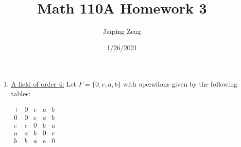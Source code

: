 \documentclass{article}
\title{Math 110A Homework 3}
\date{1/26/2021}
\author{Jiaping Zeng}
\begin{document}
\maketitle

\begin{enumerate}
      \item \underline{A field of order 4:} Let $F=\{0,e,a,b\}$ with operations given by the following tables:
            \begin{center}
                  \begin{multicols}{2}
                        $\begin{array}{c|cccc}
                                    + & 0 & e & a & b \\
                                    \hline
                                    0 & 0 & e & a & b \\
                                    e & e & 0 & b & a \\
                                    a & a & b & 0 & e \\
                                    b & b & a & e & 0
                              \end{array}$


\end{multicols}
\end{center}
\end{enumerate}
\end{document}
